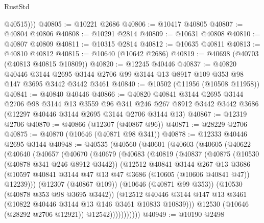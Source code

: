 \begin{lexlean}{RustStd}
\begin{coremodule}
          @40515)))
@40805 := @10221 @2686
@40806 := @10417 @40805
@40807 := @40804 @40806
@40808 := @10291 @2814
@40809 := @10631 @40808
@40810 := @40807 @40809
@40811 := @10315 @2814
@40812 := @10635 @40811
@40813 := @40810 @40812
@40815 := @10640 (@10642 @2686)
@40819 := @40698 (@40703 (@40813 @40815 @10809))
@40820 := @12245 @40446
@40837 := @40820
    @40446
    @3144
    @2695
    @3144
    @2706
    @99
    @3144
    @13
    @8917
    @109
    @353
    @98
    @147
    @3695
    @3442
    @3442
    @3461
@40840 := @10502 (@11956 (@10508 @11958))
@40841 := @40840 @40446
@40866 := @40820
    @40841
    @3144
    @2695
    @3144
    @2706
    @98
    @3144
    @13
    @3559
    @96
    @341
    @246
    @267
    @8912
    @3442
    @3442
    @3686
    (@12297 @40446 @3144 @2695 @3144 @2706 @3144 @13)
@40867 := @12319 @2706
@40870 := @40866 (@12307 (@40867 @96))
@40871 := @28229 @2706
@40875 := @40870 (@10646 (@40871 @98 @341))
@40878 := @12333 @40446 @2695 @3144
@40948 := @40535
    (@40560
      (@40601
        (@40603
          (@40605
            (@40622
              (@40640
                (@40657
                  (@40670
                    (@40679
                      (@40683
                        (@40819
                          (@40837
                            (@40875
                              (@10530 (@40878 @341 @246 @8912 @3442))
                              (@12512
                                @40841
                                @3144
                                @267
                                @13
                                @3686
                                (@10597
                                  @40841
                                  @3144
                                  @47
                                  @13
                                  @47
                                  @3686
                                  (@10605 (@10606 @40841 @47))
                                  @12239)))
                            (@12307 (@40867 @109))
                            (@10646 (@40871 @99 @353))
                            (@10530 (@40878 @353 @98 @3695 @3442))
                            (@12512
                              @40446
                              @3144
                              @147
                              @13
                              @3461
                              (@10822 @40446 @3144 @13 @146 @3461 @10833 @10839)))
                          @12530
                          (@10646 (@28292 @2706 @12921))
                          @12542)))))))))))
@40949 := @10190 @2498

\end{coremodule}
\end{lexlean}
